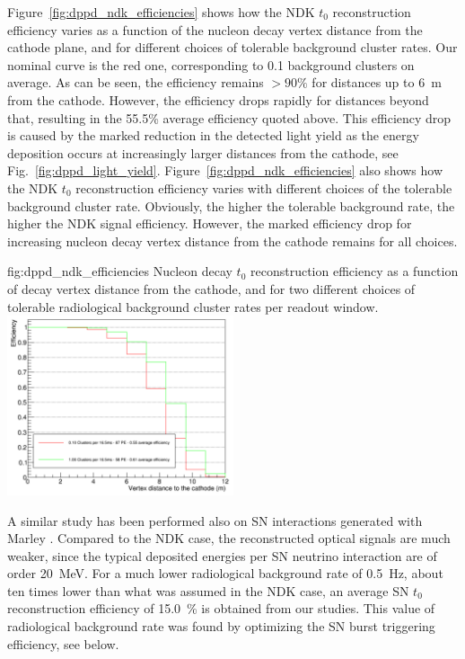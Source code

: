 Figure~\ref{fig:dppd_ndk_efficiencies} shows how the NDK $t_0$ reconstruction efficiency varies as a function of the nucleon decay vertex distance from the cathode plane, and for different choices of tolerable background cluster rates. Our nominal curve is the red one, corresponding to \num{0.1} background clusters on average. As can be seen, the efficiency remains $>90\%$ for distances up to \SI{6}{\m} from the cathode. However, the efficiency drops rapidly for distances beyond that, resulting in the \num{55.5}\% average efficiency quoted above. This efficiency drop is caused by the marked reduction in the detected light yield as the energy deposition occurs at increasingly larger distances from the cathode, see Fig.~\ref{fig:dppd_light_yield}. Figure~\ref{fig:dppd_ndk_efficiencies} also shows how the NDK $t_0$ reconstruction efficiency varies with different choices of the tolerable background cluster rate. Obviously, the higher the tolerable background rate, the higher the NDK signal efficiency. However, the marked efficiency drop for increasing nucleon decay vertex distance from the cathode remains for all choices.

\begin{dunefigure}{fig:dppd_ndk_efficiencies}
     {Nucleon decay $t_0$ reconstruction efficiency as a function of decay vertex distance from the cathode, and for two different choices of tolerable radiological background cluster rates per readout window.}
    \includegraphics[width=0.5\textwidth]{graphics/dppd_ndk_efficiencies.pdf}
    \end{dunefigure}




A similar study has been performed also on SN \nue {} interactions generated with Marley \cite{marley}. Compared to the NDK case, the reconstructed optical signals are much weaker, since the typical deposited energies per SN neutrino interaction are of order \SI{20}{\MeV}. For a much lower radiological background rate of \SI{0.5}{\Hz}, about ten times lower than what was assumed in the NDK case, an average SN $t_0$ reconstruction efficiency of \SI{15.0}{\%} is obtained from our studies. This value of radiological background rate was found by optimizing the SN burst triggering efficiency, see below. 

